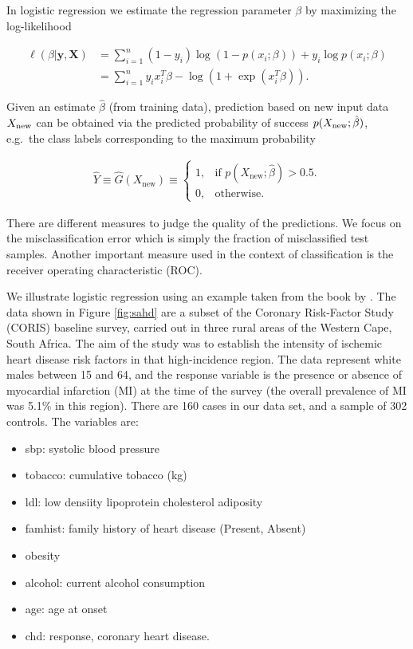 \documentclass[
]{book}
\providecommand{\tightlist}{%
  \setlength{\itemsep}{0pt}\setlength{\parskip}{0pt}}
\begin{document}
In logistic regression we estimate the regression parameter \(\beta\) by maximizing the log-likelihood

\begin{align*}
\ell(\beta|\textbf{y},\textbf{X})&=\sum_{i=1}^{n}(1-y_i)\log(1-p(x_i;\beta))+y_i\log p(x_i;\beta)\\
&=\sum_{i=1}^{n}y_i x_i^T\beta - \log(1+\exp(x_i^T\beta)).
\end{align*}

Given an estimate \(\hat \beta\) (from training data), prediction based on new input data \(X_{\rm new}\) can be obtained via the predicted probability of success \(p(X_{\rm new};\hat \beta)\), e.g.~the class labels corresponding to the maximum probability

\begin{align*}
  \hat{Y}\equiv\hat{G}(X_{\textrm{new}})\equiv\left\{
    \begin{array}{ll}
      1, & \mbox{if $p(X_{\textrm{new}};\hat\beta)>0.5$}.\\
      0, & \mbox{otherwise}.
    \end{array}
  \right.
\end{align*}

There are different measures to judge the quality of the predictions. We focus on the misclassification error which is simply the fraction of misclassified test samples. Another important measure used in the context of classification is the receiver operating characteristic (ROC).

We illustrate logistic regression using an example taken from the book by \citet{elements}. The data shown in Figure \ref{fig:sahd} are a
subset of the Coronary Risk-Factor Study (CORIS) baseline survey, carried
out in three rural areas of the Western Cape, South Africa. The aim of the study was to establish the intensity of ischemic
heart disease risk factors in that high-incidence region. The data represent
white males between 15 and 64, and the response variable is the presence or
absence of myocardial infarction (MI) at the time of the survey (the overall
prevalence of MI was 5.1\% in this region). There are 160 cases in our data
set, and a sample of 302 controls. The variables are:

\begin{itemize}
\tightlist
\item
  sbp: systolic blood pressure
\item
  tobacco: cumulative tobacco (kg)
\item
  ldl: low densiity lipoprotein cholesterol adiposity
\item
  famhist: family history of heart disease (Present, Absent)
\item
  obesity
\item
  alcohol: current alcohol consumption
\item
  age: age at onset
\item
  chd: response, coronary heart disease.
\end{itemize}
\end{document}
